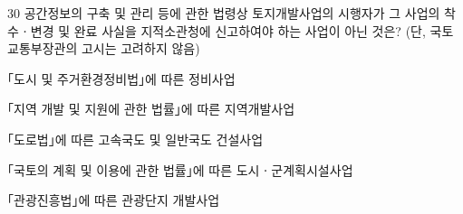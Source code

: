 \begin{question}{30}
공간정보의 구축 및 관리 등에 관한 법령상 토지개발사업의 시행자가 그 사업의 착수ㆍ변경 및 완료 사실을 지적소관청에 신고하여야 하는 사업이 아닌 것은? (단, 국토교통부장관의 고시는 고려하지 않음)
\begin{choices}
  \item ｢도시 및 주거환경정비법｣에 따른 정비사업
  \item ｢지역 개발 및 지원에 관한 법률｣에 따른 지역개발사업
  \item ｢도로법｣에 따른 고속국도 및 일반국도 건설사업
  \item ｢국토의 계획 및 이용에 관한 법률｣에 따른 도시ㆍ군계획시설사업
  \item ｢관광진흥법｣에 따른 관광단지 개발사업
\end{choices}
\end{question}
